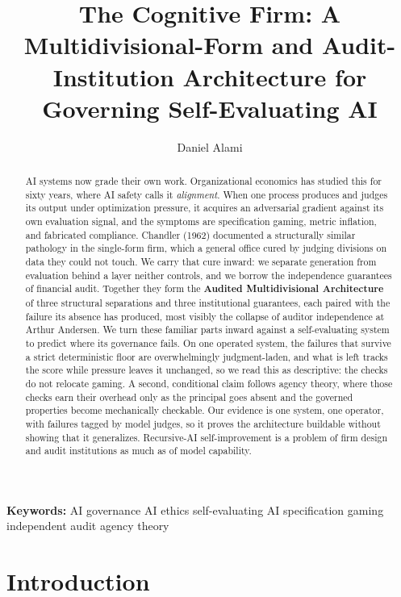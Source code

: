 \documentclass[11pt]{article}
\title{The Cognitive Firm: A Multidivisional-Form and Audit-Institution Architecture for Governing Self-Evaluating AI}
\author{Daniel Alami}
\date{}
\begin{document}
\maketitle

\begin{abstract}
AI systems now grade their own work. Organizational economics has studied this for sixty years, where AI safety calls it \emph{alignment}. When one process produces and judges its output under optimization pressure, it acquires an adversarial gradient against its own evaluation signal, and the symptoms are specification gaming, metric inflation, and fabricated compliance. Chandler (1962) documented a structurally similar pathology in the single-form firm, which a general office cured by judging divisions on data they could not touch. We carry that cure inward: we separate generation from evaluation behind a layer neither controls, and we borrow the independence guarantees of financial audit. Together they form the \textbf{Audited Multidivisional Architecture} of three structural separations and three institutional guarantees, each paired with the failure its absence has produced, most visibly the collapse of auditor independence at Arthur Andersen. We turn these familiar parts inward against a self-evaluating system to predict where its governance fails. On one operated system, the failures that survive a strict deterministic floor are overwhelmingly judgment-laden, and what is left tracks the score while pressure leaves it unchanged, so we read this as descriptive: the checks do not relocate gaming. A second, conditional claim follows agency theory, where those checks earn their overhead only as the principal goes absent and the governed properties become mechanically checkable. Our evidence is one system, one operator, with failures tagged by model judges, so it proves the architecture buildable without showing that it generalizes. Recursive-AI self-improvement is a problem of firm design and audit institutions as much as of model capability.
\end{abstract}

\vspace{0.5em}\noindent\textbf{Keywords:} AI governance \textperiodcentered{} AI ethics \textperiodcentered{} self-evaluating AI \textperiodcentered{} specification gaming \textperiodcentered{} independent audit \textperiodcentered{} agency theory

\section{Introduction}
\end{document}
